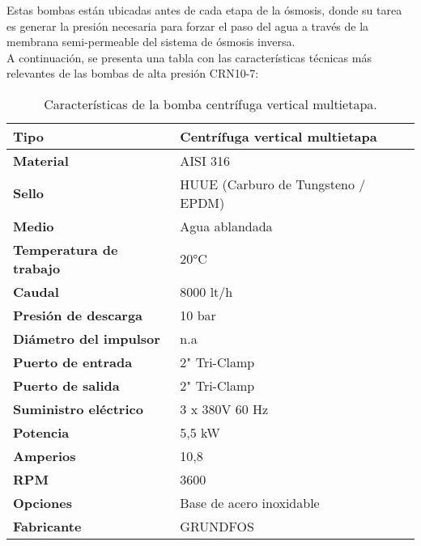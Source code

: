 Estas bombas están ubicadas antes de cada etapa de la ósmosis, donde su tarea es generar la presión necesaria para forzar el paso del agua a través de la membrana semi-permeable del sistema de ósmosis inversa.\\

A continuación, se presenta una tabla con las características técnicas más relevantes de las bombas de alta presión CRN10-7:\\

\begin{table}[H]
    \centering
    \caption{Características de la bomba centrífuga vertical multietapa.}
    \label{table:bomba_centrifuga}
    \begin{tabular}{| L{5cm} | L{5cm} |}
       
        \hline
        \textbf{Tipo} & Centrífuga vertical multietapa  \\
        \hline
        \textbf{Material} & AISI 316  \\
        \hline
        \textbf{Sello} & HUUE (Carburo de Tungsteno / EPDM)  \\
        \hline
        \textbf{Medio} & Agua ablandada  \\
        \hline
        \textbf{Temperatura de trabajo} & 20°C  \\
        \hline
        \textbf{Caudal} & 8000 lt/h  \\
        \hline
        \textbf{Presión de descarga} & 10 bar  \\
        \hline
        \textbf{Diámetro del impulsor} & n.a  \\
        \hline
        \textbf{Puerto de entrada} & 2" Tri-Clamp  \\
        \hline
        \textbf{Puerto de salida} & 2" Tri-Clamp  \\
        \hline
        \textbf{Suministro eléctrico} & 3 x 380V 60 Hz  \\
        \hline
        \textbf{Potencia} & 5,5 kW  \\
        \hline
        \textbf{Amperios} & 10,8  \\
        \hline
        \textbf{RPM} & 3600  \\
        \hline
        \textbf{Opciones} & Base de acero inoxidable  \\
        \hline
        \textbf{Fabricante} & GRUNDFOS  \\
        \hline
    \end{tabular}
\end{table}




